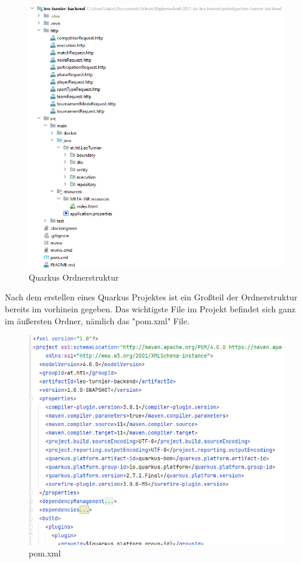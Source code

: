 \begin{figure}[H]
    \includegraphics[scale=0.8]{pics/backend/quarkus_file_structure.png}
    \caption{Quarkus Ordnerstruktur}
\end{figure}

Nach dem erstellen eines Quarkus Projektes ist ein Großteil der Ordnerstruktur bereits im vorhinein gegeben. Das wichtigste File im Projekt befindet sich ganz im äußersten Ordner, nämlich das "pom.xml" File. 

\begin{figure}[H]
    \includegraphics[scale=0.6]{pics/backend/pom.xml.png}
    \caption{pom.xml}
\end{figure}

